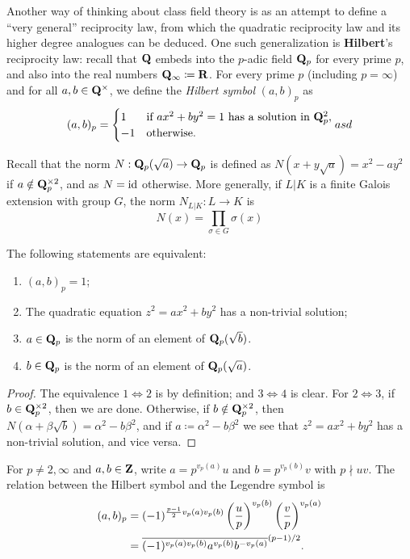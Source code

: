 \documentclass{article}
\begin{document}
Another way of thinking about class field theory is as an attempt to define a ``very general'' reciprocity law, from which the quadratic reciprocity law and its higher degree analogues can be deduced. One such generalization is \textbf{Hilbert}'s reciprocity law: recall that $\mathbf{Q}$ embeds into the $p$-adic field $\mathbf{Q}_p$ for every prime $p$, and also into the real numbers $\mathbf{Q}_\infty\coloneqq\mathbf{R}$.
For every prime $p$ (including $p=\infty$) and for all $a,b\in \mathbf{Q}^\times$, we define the \emph{Hilbert symbol} $(a,b)_p$ as
\[
	(a,b)_p = \begin{cases}
		1  & \text{if $ax^2 + by^2 = 1$ has a solution in $\mathbf{Q}_p^2$}, \\
		-1 & \text{otherwise}.
	\end{cases} asd
\]

Recall that the norm $N:\mathbf{Q}_p(\sqrt{a})\to \mathbf{Q}_p$ is defined as $N(x+y\sqrt{a}) = x^2 - ay^2$ if $a\notin \mathbf{Q}_p^{\times 2}$, and as $N=\operatorname{id}$ otherwise. More generally, if $L|K$ is a finite Galois extension with group $G$, the norm $N_{L|K}:L\to K$ is
\[
	N(x)=\prod_{\sigma\in G} \sigma(x)
\]
\begin{lem}
	The following statements are equivalent:
	\begin{enumerate}
		\item $(a,b)_p = 1$;
		\item The quadratic equation $z^2 = ax^2 + by^2$ has a non-trivial solution;
		\item $a\in \mathbf{Q}_p$ is the norm of an element of $\mathbf{Q}_p(\sqrt{b})$.
		\item $b\in \mathbf{Q}_p$ is the norm of an element of $\mathbf{Q}_p(\sqrt{a})$.
	\end{enumerate}
\end{lem}
\begin{proof}
	The equivalence $1\iff 2$ is by definition; and $3\iff 4$ is clear.
	For $2\iff 3$, if $b\in \mathbf{Q}_p^{\times 2}$, then we are done. Otherwise, if $b\notin \mathbf{Q}_p^{\times 2}$, then $N(\alpha+\beta\sqrt{b})= \alpha^2 - b\beta^2$, and if $a\coloneqq \alpha^2 - b\beta^2$ we see that $z^2 = ax^2 + by^2$ has a non-trivial solution, and vice versa.
\end{proof}
For $p\ne 2, \infty$ and $a,b\in\mathbf{Z}$, write
$a=p^{v_p(a)}u$ and $b=p^{v_p(b)}v$ with $p\nmid uv$. The relation between the Hilbert symbol and the Legendre symbol is
\begin{align}
	(a,b)_p
	 & = (-1)^{\frac{p-1}{2}v_p(a)v_p(b)}
	\left(\frac{u}{p}\right)^{v_p(b)}\left(\frac{v}{p}\right)^{v_p(a)}                    \\
	 & = \overline{(-1)^{v_p(a)v_p(b)}a^{v_p(b)}b^{-v_p(a)}}^{(p-1)/2}.
\end{align}
\end{document}
